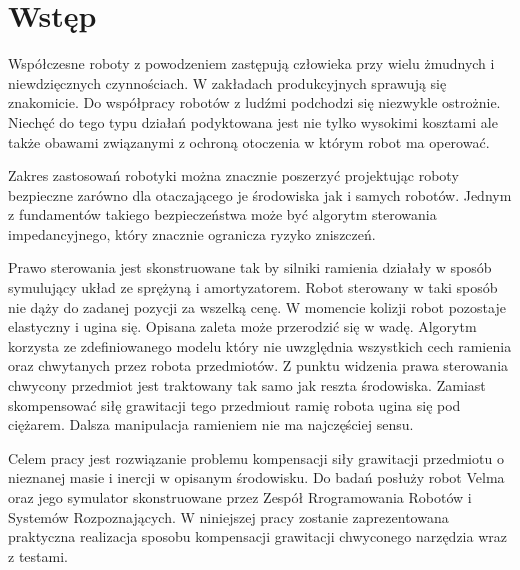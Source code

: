 
\chapter{Wstęp\label{chap:wstep}}

	Współczesne roboty z powodzeniem zastępują człowieka przy wielu żmudnych i niewdzięcznych czynnościach.  W zakładach produkcyjnych sprawują się znakomicie. Do współpracy robotów z ludźmi podchodzi się niezwykle ostrożnie. Niechęć do tego typu działań podyktowana jest nie tylko wysokimi kosztami ale także obawami związanymi z ochroną otoczenia w którym robot ma operować.
	
	Zakres zastosowań robotyki można znacznie poszerzyć projektując roboty bezpieczne zarówno dla otaczającego je środowiska jak i samych robotów. Jednym z fundamentów takiego bezpieczeństwa może być algorytm sterowania impedancyjnego, który znacznie ogranicza ryzyko zniszczeń. 
	
	Prawo sterowania jest skonstruowane tak by silniki ramienia działały w sposób symulujący układ ze sprężyną i amortyzatorem. Robot sterowany w taki sposób nie dąży do zadanej pozycji za wszelką cenę. W momencie kolizji robot pozostaje elastyczny i ugina się. Opisana zaleta może przerodzić się w wadę. Algorytm korzysta ze zdefiniowanego modelu który nie uwzględnia wszystkich cech ramienia oraz chwytanych przez robota przedmiotów. Z punktu widzenia prawa sterowania chwycony przedmiot jest traktowany tak samo jak reszta środowiska. Zamiast skompensować siłę grawitacji tego przedmiout ramię robota ugina się pod ciężarem. Dalsza manipulacja ramieniem nie ma najczęściej sensu. 

	Celem pracy jest rozwiązanie problemu kompensacji siły grawitacji przedmiotu o nieznanej masie i inercji w opisanym środowisku. 
	Do badań posłuży robot Velma oraz jego symulator skonstruowane przez Zespół Rrogramowania Robotów i Systemów Rozpoznających. W niniejszej pracy zostanie zaprezentowana praktyczna realizacja sposobu kompensacji grawitacji chwyconego narzędzia wraz z testami.
